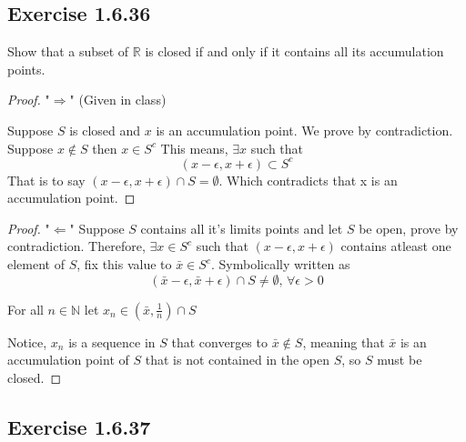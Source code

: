 \documentclass{tufte-book}
\theoremstyle{mytheoremstyle}
\theoremstyle{mylemstyle}
\theoremstyle{mydefstyle}
\begin{document}
\subsection{Exercise 1.6.36}
Show that a subset of $\mathbb{R}$ is closed if and only if it contains all its accumulation points.

\begin{proof}"$\Rightarrow$" (Given in class)

Suppose $S$ is closed and $x$ is an accumulation point.  We prove by contradiction.  Suppose $x \notin S$ then $x \in S^c$  This means, $\exists x$ such that
\[(x - \epsilon, x+\epsilon) \subset S^c \]
That is to say $(x-\epsilon, x+\epsilon) \cap S = \emptyset$.  Which contradicts that x is an accumulation point.
\end{proof}

\begin{proof}"$\Leftarrow$"
Suppose $S$ contains all it's limits points and let $S$ be open, prove by contradiction.  Therefore, $\exists x \in S^c$ such that $(x- \epsilon, x+\epsilon)$ contains atleast one element of $S$, fix this value to $\bar{x} \in S^c$.  Symbolically written as
\[(\bar{x}- \epsilon, \bar{x}+\epsilon) \cap S \neq \emptyset \text{,  } \forall \epsilon > 0\]

For all $n \in \mathbb{N}$ let $x_n \in (\bar{x}, \frac{1}{n}) \cap S$

Notice, ${x_n}$ is a sequence in $S$ that converges to $\bar{x} \notin S$, meaning that $\bar{x}$ is an accumulation point of $S$ that is not contained in the open $S$, so $S$ must be closed.
\end{proof}

\subsection{Exercise 1.6.37}
\end{document}
